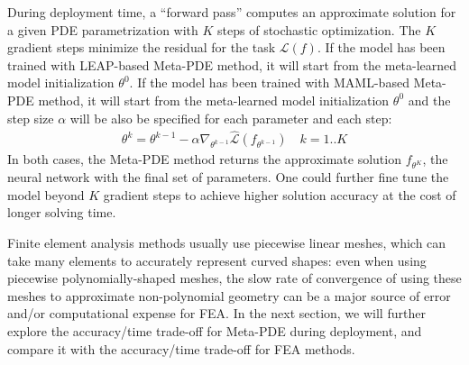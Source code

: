 During deployment time, a ``forward pass'' computes an approximate solution for a given PDE parametrization with $K$ steps of stochastic optimization. The $K$ gradient steps minimize the residual for the task $\mathcal{L}(f)$. If the model has been trained with LEAP-based Meta-PDE method, it will start from the meta-learned model initialization $\theta^0$. If the model has been trained with MAML-based Meta-PDE method, it will start from the meta-learned model initialization $\theta^0$ and the step size $\alpha$ will be also be specified for each parameter and each step: 
\begin{align}
  \theta^k = \theta^{k-1} - \alpha \nabla_{\theta^{k-1}} \hat{\mathcal{L}}(f_{\theta^{k-1}}) \quad k = 1 .. K
\end{align}
In both cases, the Meta-PDE method returns the approximate solution $f_{\theta^K}$, the neural network with the final set of parameters. One could further fine tune the model beyond $K$ gradient steps to achieve higher solution accuracy at the cost of longer solving time. 

Finite element analysis methods usually use piecewise linear meshes, which can take many elements to accurately represent curved shapes: even when using piecewise polynomially-shaped meshes, the slow rate of convergence of using these meshes to approximate non-polynomial geometry can be a major source of error and/or computational expense for FEA. In the next section, we will further explore the accuracy/time trade-off for Meta-PDE during deployment, and compare it with the accuracy/time trade-off for FEA methods. 

